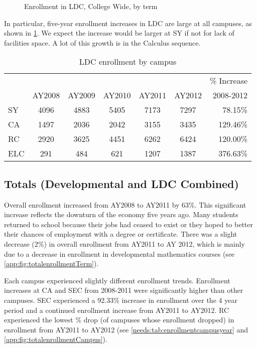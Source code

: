 \begin{figure}[!htb]
	\centering
	
	\caption{Enrollment in LDC, College Wide, by term}
	\label{needs:fig:enrollmentLDCTerm}
\end{figure}

In particular, five-year enrollment increases  in LDC are large at all
campuses, as shown in \cref{needs:tab:LDCenrollmentCampus}.  We expect the
increase would be larger at SY if not for lack of facilities space. A lot of
this growth is in the Calculus sequence.   

\begin{table}[!htb]
	\centering
	\caption{LDC enrollment by campus}
	\label{needs:tab:LDCenrollmentCampus}
	\begin{tabular}{l*{5}{c}r}
		\toprule
		    &        &        &        &        &        & \% Increase \\
		    & AY2008 & AY2009 & AY2010 & AY2011 & AY2012 & 2008-2012   \\
		\midrule
		SY  & 4096   & 4883   & 5405   & 7173   & 7297   & 78.15\%     \\
		CA  & 1497   & 2036   & 2042   & 3155   & 3435   & 129.46\%    \\
		RC  & 2920   & 3625   & 4451   & 6262   & 6424   & 120.00\%    \\
		ELC & 291    & 484    & 621    & 1207   & 1387   & 376.63\%    \\
		\bottomrule
	\end{tabular}
\end{table}

\subsection{Totals (Developmental and LDC Combined)}
Overall enrollment increased from AY2008 to AY2011 by 63\%. This significant
increase reflects the downturn of the economy five years ago. Many students
returned to school because their jobs had ceased to exist or they hoped to
better their chances of employment with a degree or certificate. There was a
slight decrease (2\%) in overall enrollment from AY2011 to AY 2012, which is
mainly due to a decrease in enrollment in developmental mathematics courses
(see \vref{app:fig:totalenrollmentTerm}).

Each campus experienced slightly different enrollment trends. Enrollment
increases at CA and SEC from 2008-2011 were significantly higher than other
campuses. SEC experienced a 92.33\% increase in enrollment over the 4 year
period and a continued enrollment increase from AY2011 to AY2012. RC
experienced the lowest \% drop (of campuses whose enrollment dropped)  in
enrollment from AY2011 to AY2012 (see \vref{needs:tab:enrollmentcampusyear} and
\vref{app:fig:totalenrollmentCampus}).

